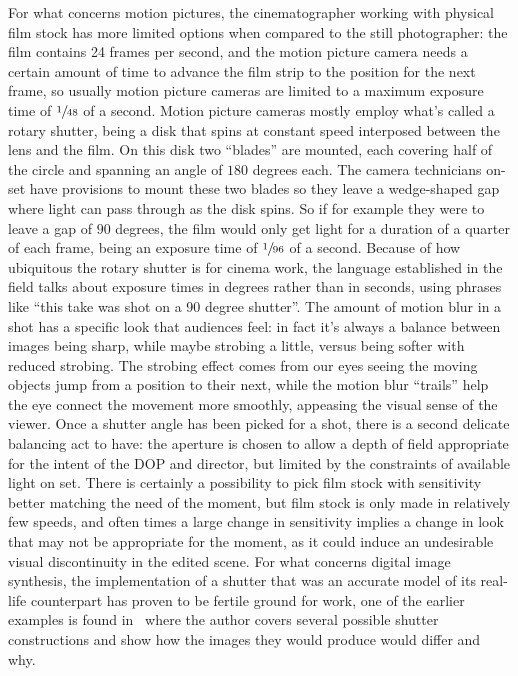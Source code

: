 For what concerns motion pictures, the cinematographer working with physical film stock has more limited 
options when compared to the still photographer: the film contains 24 frames per second, and the motion
picture camera needs a certain amount of time to advance the film strip to the position for the next frame,
so usually motion picture cameras are limited to a maximum exposure time of $\sfrac1{48}$ of a second.
Motion picture cameras mostly employ what's called a \gls{rotary shutter}, being a disk that spins 
at constant speed interposed between the lens and the film. 
On this disk two ``blades'' are mounted, each covering half of the circle and spanning an angle of $180$ degrees each. 
The camera technicians on-set have provisions to mount these two blades so they leave a 
wedge-shaped gap where light can pass through as the disk spins.
So if for example they were to leave a gap of $90$ degrees, the film would only get light for a 
duration of a quarter of each frame, being an exposure time of $\sfrac1{96}$ of a second.
Because of how ubiquitous the \gls{rotary shutter} is for cinema work, the language established in the field
talks about exposure times in degrees rather than in seconds, using phrases like 
``this take was shot on a 90 degree shutter''.
The amount of motion blur in a shot has a specific look that audiences feel: in fact it's 
always a balance between images being sharp, while maybe \gls{strobing} a little, versus being 
softer with reduced \gls{strobing}. The strobing effect comes from our eyes seeing the moving objects
jump from a position to their next, while the motion blur ``trails'' help the eye connect the 
movement more smoothly, appeasing the visual sense of the viewer.
Once a \gls{shutter} angle has been picked for a shot, there is a second delicate balancing act
to have: the \gls{aperture} is chosen to allow a depth of field appropriate for the intent
of the \gls{DOP} and director, but limited by the constraints of available light on set.
There is certainly a possibility to pick film stock with sensitivity better matching the need
of the moment, but film stock is only made in relatively few speeds, and often times a large change
in sensitivity implies a change in look that may not be appropriate for the moment, as it could
induce an undesirable visual discontinuity in the edited scene.
For what concerns digital image synthesis, the implementation of a shutter that was an accurate 
model of its real-life counterpart has proven to be fertile ground for work, one of the earlier
examples is found in~\cite{glassner99} where the author covers several possible shutter constructions
and show how the images they would produce would differ and why.

